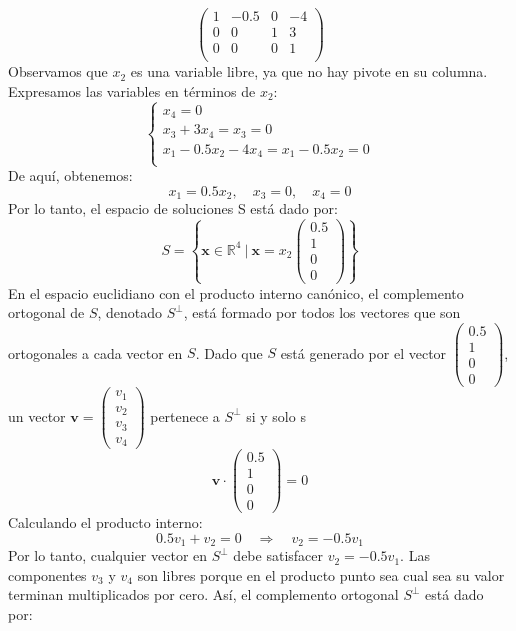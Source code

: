 \begin{solution}
\[
\begin{pmatrix}
1 & -0.5 & 0 & -4 \\
0 & 0 & 1 & 3 \\
0 & 0 & 0 & 1 \\
\end{pmatrix}
\]
Observamos que \( x_2 \) es una variable libre, ya que no hay pivote en su columna. Expresamos las variables en términos de $x_2$:
\[
\begin{cases}
x_4 = 0 \\
x_3 + 3x_4 = x_3 = 0 \\
x_1 - 0.5x_2 - 4x_4 = x_1 - 0.5x_2 = 0 \\
\end{cases}
\]
De aquí, obtenemos:
\[
x_1 = 0.5x_2, \quad x_3 = 0, \quad x_4 = 0
\]
Por lo tanto, el espacio de soluciones S está dado por:
\[
S = \left\{ \mathbf{x} \in \mathbb{R}^4 \ \bigg| \ \mathbf{x} = x_2 \begin{pmatrix} 0.5 \\ 1 \\ 0 \\ 0 \end{pmatrix} \right\}
\]
En el espacio euclidiano con el producto interno canónico, el complemento ortogonal de \( S \), denotado \( S^\perp \), está formado por todos los vectores que son ortogonales a cada vector en \( S \).
Dado que \( S \) está generado por el vector \( \begin{pmatrix} 0.5 \\ 1 \\ 0 \\ 0 \end{pmatrix} \), un vector \( \mathbf{v} = \begin{pmatrix} v_1 \\ v_2 \\ v_3 \\ v_4 \end{pmatrix} \) pertenece a \( S^\perp \) si y solo s
\[
\mathbf{v} \cdot \begin{pmatrix} 0.5 \\ 1 \\ 0 \\ 0 \end{pmatrix} = 0
\]
Calculando el producto interno:
\[
0.5v_1 + v_2 = 0 \quad \Rightarrow \quad v_2 = -0.5v_1
\]
Por lo tanto, cualquier vector en \( S^\perp \) debe satisfacer \( v_2 = -0.5v_1 \). Las componentes \( v_3 \) y \( v_4 \) son libres porque en el producto punto sea cual sea su valor terminan multiplicados por cero.
Así, el complemento ortogonal \( S^\perp \) está dado por:

\end{solution}

